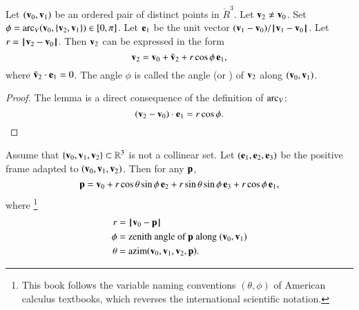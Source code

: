 \begin{lemma}[zenith]
     Let
  $({\mathbf v}_0,{\mathbf v}_1)$ be an ordered pair of distinct points in $\ring{R}^3$.
  Let ${\mathbf v}_2\ne {\mathbf v}_0$.  Set $\phi =
  \operatorname{arc}_V({\mathbf v}_0,\{{\mathbf v}_2,{\mathbf v}_1\})\in[0,\pi]$.  Let ${\mathbf e}_1$ be the unit
  vector $(\v_1-\v_0)/\norm{\v_1}{\v_0}$.  Let $r =
  \norm{\v_2}{\v_0}$.  Then ${\mathbf v}_2$ can be expressed in the form
\[ 
{\mathbf v}_2 = {\mathbf v}_0 + \bar{{\mathbf v}}_2 +
r\cos\phi\, {\mathbf e}_1,
\] 
where $\bar{{\mathbf v}}_2\cdot {\mathbf e}_1 = 0$.  The angle $\phi$ is called the
 angle (or ) of ${\mathbf v}_2$ along
$({\mathbf v}_0,{\mathbf v}_1)$.  %
%
\end{lemma}

\begin{proof} The lemma is a direct consequence of the definition of $\operatorname{arc}_V$:
\[ ({\mathbf v}_2-{\mathbf v}_0)\cdot {\mathbf e}_1 = r\cos\phi.\] 
\end{proof}

\begin{lemma}\label{lemma:sph}
  Assume that
  $\{{\mathbf v}_0,{\mathbf v}_1,{\mathbf v}_2\}\subset\mathbb{R}^3$ %
  is not a collinear set.  Let $({\mathbf e}_1,{\mathbf e}_2,{\mathbf e}_3)$ be the positive
  frame adapted to $({\mathbf v}_0,{\mathbf v}_1,{\mathbf v}_2)$.  Then for any ${\mathbf p}$,
\begin{equation}
{\mathbf p} = {\mathbf v}_0 + r \cos\theta \sin\phi\, {\mathbf e}_2 + r \sin\theta\sin\phi\, {\mathbf e}_3 +
r\cos\phi\,{\mathbf e}_1,
\label{eqn:sph}
\end{equation}
where%
  \footnote{This book follows the variable naming conventions
    $(\theta,\phi)$ of American calculus textbooks, which reverses the
    international scientific notation.} 
\begin{align*}
r &= \norm{\v_0 }{ \p}\\
\phi &= \text{zenith angle of } \p \text{ along } (\v_0,\v_1)\\
\theta &=\op{azim}(\v_0,\v_1,\v_2,\p).
\end{align*}
\end{lemma}

%
%
%
%
%
%

%
%
%

%
%
%
%
%
%

